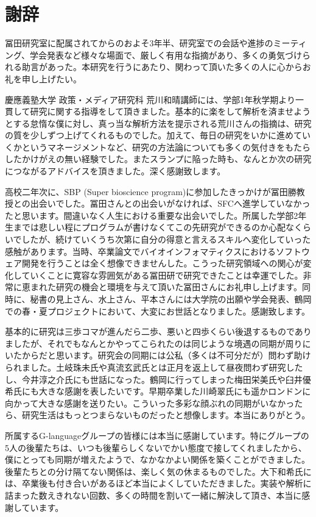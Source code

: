 \chapter*{謝辞}
冨田研究室に配属されてからのおよそ3年半、研究室での会話や進捗のミーティング、学会発表など様々な場面で、厳しく有用な指摘があり、多くの勇気づけられる助言があった。本研究を行うにあたり、関わって頂いた多くの人に心からお礼を申し上げたい。
\par
慶應義塾大学 政策・メディア研究科 荒川和晴講師には、学部1年秋学期より一貫して研究に関する指導をして頂きました。基本的に楽をして解析を済ませようとする怠惰な僕に対し、真っ当な解析方法を提示される荒川さんの指摘は、研究の質を少しずつ上げてくれるものでした。加えて、毎日の研究をいかに進めていくかというマネージメントなど、研究の方法論についても多くの気付きをもたらしたかけがえの無い経験でした。またスランプに陥った時も、なんとか次の研究につながるアドバイスを頂きました。深く感謝致します。
\par
高校二年次に、SBP (Super bioscience program)に参加したきっかけが冨田勝教授との出会いでした。冨田さんとの出会いがなければ、SFCへ進学していなかったと思います。間違いなく人生における重要な出会いでした。所属した学部2年生までは悲しい程にプログラムが書けなくてこの先研究ができるのか心配なくらいでしたが、続けていくうち次第に自分の得意と言えるスキルへ変化していった感触があります。当時、卒業論文でバイオインフォマティクスにおけるソフトウェア開発を行うことは全く想像できませんした。こうった研究領域への関心が変化していくことに寛容な雰囲気がある冨田研で研究できたことは幸運でした。非常に恵まれた研究の機会と環境を与えて頂いた冨田さんにお礼申し上げます。同時に、秘書の見上さん、水上さん、平本さんには大学院の出願や学会発表、鶴岡での春・夏プロジェクトにおいて、大変にお世話となりました。感謝致します。
\par
基本的に研究は三歩コマが進んだら二歩、悪いと四歩くらい後退するものでありましたが、それでもなんとかやってこられたのは同じような境遇の同期が周りにいたからだと思います。研究会の同期には公私（多くは不可分だが）問わず助けられました。土岐珠未氏や真流玄武氏とは正月を返上して昼夜問わず研究したし、今井淳之介氏にも世話になった。鶴岡に行ってしまった梅田栄美氏や臼井優希氏にも大きな感謝を表したいです。早期卒業した川崎翠氏にも遥かロンドンに向かって大きな感謝を送りたい。こういった多彩な顔ぶれの同期がいなかったら、研究生活はもっとつまらないものだったと想像します。本当にありがとう。
\par
所属するG-languageグループの皆様には本当に感謝しています。特にグループの5人の後輩たちは、いつも後輩らしくないでかい態度で接してくれましたから、僕にとっても同期が増えたようで、なかなかよい関係を築くことができました。後輩たちとの分け隔てない関係は、楽しく気の休まるものでした。大下和希氏には、卒業後も付き合いがあるほど本当によくしていただきました。実装や解析に詰まった数えきれない回数、多くの時間を割いて一緒に解決して頂き、本当に感謝しています。
